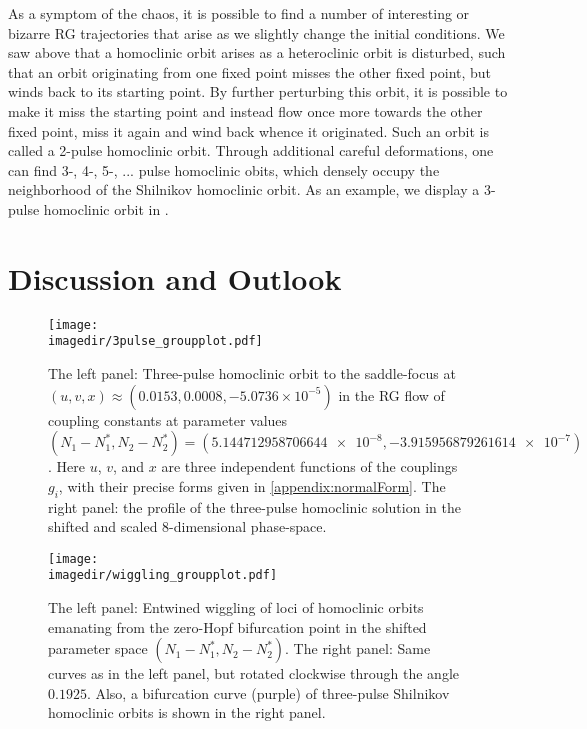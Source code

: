 As a symptom of the chaos, it is possible to find a number of interesting or bizarre RG trajectories that arise as we slightly change the initial conditions. We saw above that a homoclinic orbit arises as a heteroclinic orbit is disturbed, such that an orbit originating from one fixed point misses the other fixed point, but winds back to its starting point. By further perturbing this orbit, it is possible to make it miss the starting point and instead flow once more towards the other fixed point, miss it again and wind back whence it originated. Such an orbit is called a 2-pulse homoclinic orbit. Through additional careful deformations, one can find 3-, 4-, 5-, ... pulse homoclinic obits, which densely occupy the neighborhood of the Shilnikov homoclinic orbit. As an example, we display a 3-pulse homoclinic orbit in . 






\section{Discussion and Outlook}

\begin{figure}
    \texttt{[image: \\imagedir/3pulse\_groupplot.pdf]}
    \caption{The left panel: Three-pulse homoclinic orbit to the saddle-focus at $(u,v,x) \approx (0.0153, 0.0008, -5.0736 \times 10^{-5})$ in the RG flow of coupling constants at parameter values $(N_1-N_1^*,N_2-N_2^*)=( \num{5.144712958706644e-8},\num{-3.915956879261614e-7})$. Here $u$, $v$, and $x$ are three independent functions of the couplings $g_i$, with their precise forms given in \cref{appendix:normalForm}.
    The right panel: the profile of the three-pulse homoclinic solution in the shifted and scaled 8-dimensional phase-space.
    \label{fig:3pulse}}
\end{figure}


\begin{figure}
    \texttt{[image: \\imagedir/wiggling\_groupplot.pdf]}
    \caption{The left panel: Entwined wiggling of loci of homoclinic orbits emanating from the zero-Hopf bifurcation point in the shifted parameter space $(N_1-N_1^*,N_2-N_2^*)$. The right panel: Same curves as in the left panel, but rotated clockwise through the angle $0.1925$. Also, a bifurcation curve (purple) of three-pulse Shilnikov homoclinic orbits is shown in the right panel.
    }
    \label{fig:wigcurve}
\end{figure}


